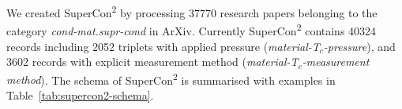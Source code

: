 \documentclass[]{interact}
\theoremstyle{plain}%
\theoremstyle{definition}
\theoremstyle{remark}
\newcommand{\tc}{T$_{c}$}
\begin{document}
We created SuperCon\textsuperscript{2} by processing 37770 research papers belonging to the category \textit{cond-mat.supr-cond} in ArXiv.
Currently SuperCon\textsuperscript{2} contains 40324 records including 2052 triplets with applied pressure (\textit{material-\tc-pressure}), and 3602 records with explicit measurement method (\textit{material-\tc-measurement method}).
The schema of SuperCon\textsuperscript{2} is summarised with examples in Table~\ref{tab:supercon2-schema}.


\afterpage {
    \clearpage %

}
\end{document}

